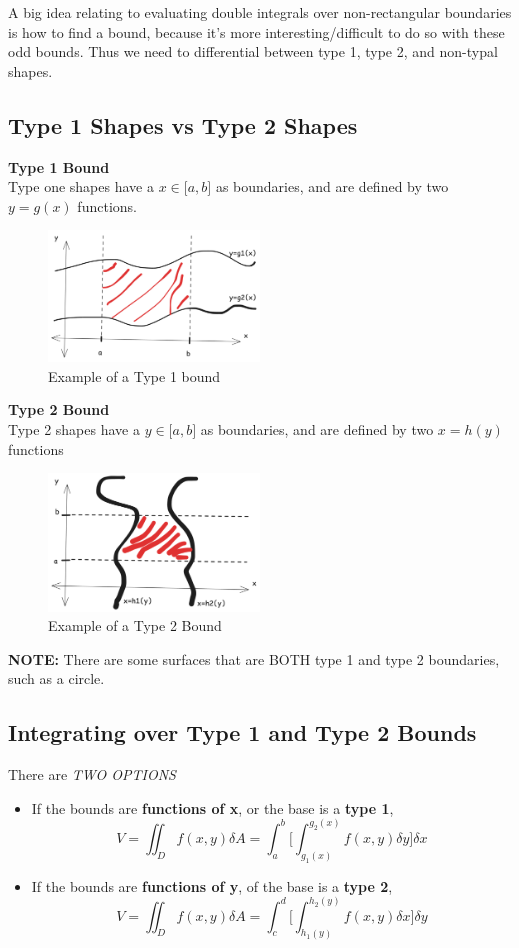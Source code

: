 \documentclass{article}
\begin{document}
A big idea relating to evaluating double integrals over non-rectangular boundaries is how to find a bound, because it's more interesting/difficult to do so with these odd bounds. Thus we need to differential between type 1, type 2, and non-typal shapes.

\subsection{Type 1 Shapes vs Type 2 Shapes}

\textbf{Type 1 Bound}\\
Type one shapes have a $x \in \lbrack a, b \rbrack$ as boundaries, and are defined by two $y = g(x)$ functions. 
\begin{figure}[H]
    \centering
    \includegraphics[width=0.5\textwidth]{figures/Type1Example.png}
    \caption{Example of a Type 1 bound}
\end{figure}
\textbf{Type 2 Bound} \\
Type 2 shapes have a $y \in \lbrack a, b \rbrack$ as boundaries, and are defined by two $x = h(y)$ functions
\begin{figure}[H]
    \centering
    \includegraphics[width=0.5\textwidth]{figures/Type2Example.png}
    \caption{Example of a Type 2 Bound}
\end{figure}
\textbf{NOTE:} There are some surfaces that are BOTH type 1 and type 2 boundaries, such as a circle. 

\subsection{Integrating over Type 1 and Type 2 Bounds}
There are \emph{TWO OPTIONS} 
\begin{itemize}
    \item If the bounds are \textbf{functions of x}, or the base is a \textbf{type 1}, $$V = \iint_D f(x, y) \delta A = \int_{a}^{b} \big[ \int_{g_1(x)}^{g_2(x)} f(x, y) \delta y \big]\delta x$$
    \item If the bounds are \textbf{functions of y}, of the base is a \textbf{type 2}, $$V = \iint_D f(x, y) \delta A =\int_{c}^{d} \big[\int_{h_1(y)}^{h_2(y)} f(x, y) \delta x \big]  \delta y $$
\end{itemize}
\end{document}
